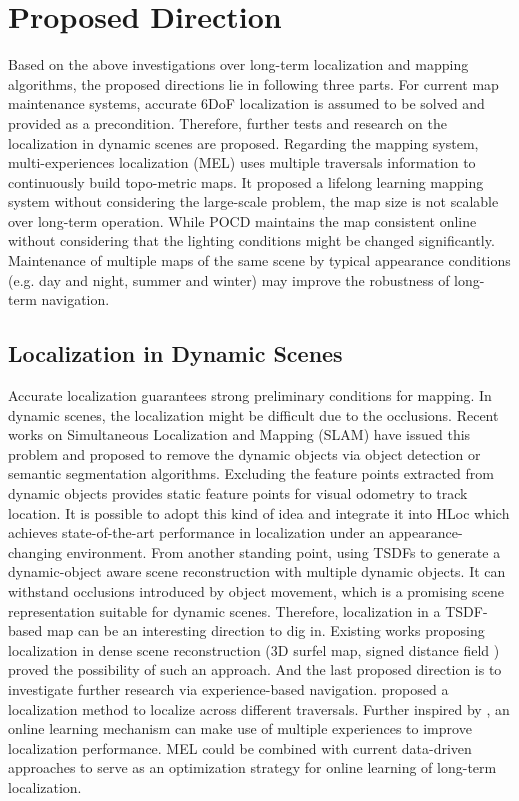 \chapter{Proposed Direction}
Based on the above investigations over long-term localization\cite{sarlin2019coarse,paton2016bridging} and mapping\cite{qian2022pocd,schmid2022panoptic} algorithms, the proposed directions lie in following three parts. For current map maintenance systems, accurate 6DoF localization is assumed to be solved and provided as a precondition. Therefore, further tests and research on the localization in dynamic scenes are proposed. Regarding the mapping system, multi-experiences localization (MEL)\cite{paton2016bridging} uses multiple traversals information to continuously build topo-metric maps. It proposed a lifelong learning mapping system without considering the large-scale problem, the map size is not scalable over long-term operation. While POCD\cite{qian2022pocd} maintains the map consistent online without considering that the lighting conditions might be changed significantly. Maintenance of multiple maps of the same scene by typical appearance conditions (e.g. day and night, summer and winter) may improve the robustness of long-term navigation.

\section{Localization in Dynamic Scenes}
Accurate localization guarantees strong preliminary conditions for mapping. In dynamic scenes, the localization might be difficult due to the occlusions. Recent works on Simultaneous Localization and Mapping (SLAM) \cite{8593691,xiao2019dynamic,henein2020dynamic} have issued this problem and proposed to remove the dynamic objects via object detection or semantic segmentation algorithms. Excluding the feature points extracted from dynamic objects provides static feature points for visual odometry to track location. It is possible to adopt this kind of idea and integrate it into HLoc \cite{sarlin2019coarse} which achieves state-of-the-art performance in localization under an appearance-changing environment. From another standing point,\cite{grinvald2021tsdf} using TSDFs to generate a dynamic-object aware scene reconstruction with multiple dynamic objects. It can withstand occlusions introduced by object movement, which is a promising scene representation suitable for dynamic scenes. Therefore, localization in a TSDF-based map can be an interesting direction to dig in. Existing works proposing localization in dense scene reconstruction (3D surfel map\cite{9197022}, signed distance field \cite{8968033}) proved the possibility of such an approach. And the last proposed direction is to investigate further research via experience-based navigation. \cite{paton2016bridging}proposed a localization method to localize across different traversals. Further inspired by \cite{yin2022bioslam}, an online learning mechanism can make use of multiple experiences to improve localization performance. MEL could be combined with current data-driven approaches to serve as an optimization strategy for online learning of long-term localization.
